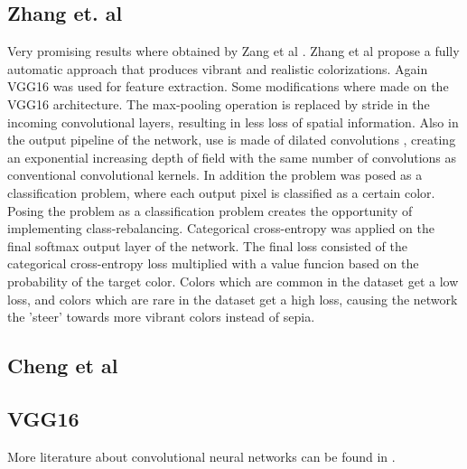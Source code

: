 \subsection{Zhang et. al}
Very promising results where obtained by Zang et al \cite{Zhang}. Zhang et al propose a fully
automatic approach that produces vibrant and realistic colorizations. Again VGG16 was used for feature extraction. Some modifications where made on the VGG16 architecture. The max-pooling operation is replaced by stride in the incoming convolutional layers, resulting in less loss of spatial information. Also in the output pipeline of the network, use is made of dilated convolutions \cite{yu2015multi}, creating an exponential increasing depth of field with the same number of convolutions as conventional convolutional kernels. In addition the problem was posed as a classification problem, where each output pixel is classified as a certain color. Posing the problem as a classification problem creates the opportunity of implementing class-rebalancing. Categorical cross-entropy was applied on the final softmax output layer of the network. The final loss consisted of the categorical cross-entropy loss multiplied with a value funcion based on the probability of the target color. Colors which are common in the dataset get a low loss, and colors which are rare in the dataset get a high loss, causing the network the 'steer' towards more vibrant colors instead of sepia. 




\subsection{Cheng et al}

\subsection{VGG16}




More literature about convolutional neural networks can be found in \cite{GoodfellowBOOK}. 


%

